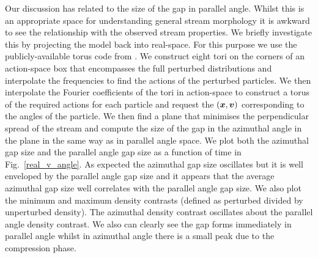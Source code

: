 \documentclass[useAMS,usenatbib,fleqn,a4paper]{mn2e}
\newcommand{\bs}[1]{\bmath{#1}}
\begin{document}
Our discussion has related to the size of the gap in parallel angle. Whilst this is an appropriate space for understanding general stream morphology it is awkward to see the relationship with the observed stream properties. We briefly investigate this by projecting the model back into real-space. For this purpose we use the publicly-available torus code from \cite{McMillanBinneyDehnen2015}. We construct eight tori on the corners of an action-space box that encompasses the full perturbed distributions and interpolate the frequencies to find the actions of the perturbed particles. We then interpolate the Fourier coefficients of the tori in action-space to construct a torus of the required actions for each particle and request the $(\bs{x},\bs{v})$ corresponding to the angles of the particle. We then find a plane that minimises the perpendicular spread of the stream and compute the size of the gap in the azimuthal angle in the plane in the same way as in parallel angle space. We plot both the azimuthal gap size and the parallel angle gap size as a function of time in Fig.~\ref{real_v_angle}. As expected the azimuthal gap size oscillates but it is well enveloped by the parallel angle gap size and it appears that the average azimuthal gap size well correlates with the parallel angle gap size. We also plot the minimum and maximum density contrasts (defined as perturbed divided by unperturbed density). The azimuthal density contrast oscillates about the parallel angle density contrast. We also can clearly see the gap forms immediately in parallel angle whilst in azimuthal angle there is a small peak due to the compression phase.
\end{document}

